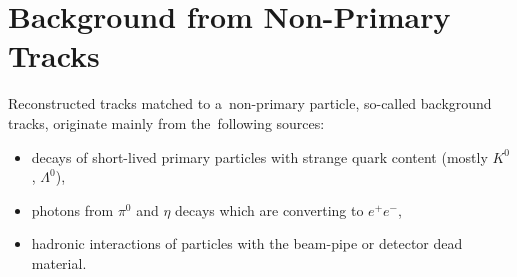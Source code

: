 \section{Background from Non-Primary Tracks}\label{section:star_background_primary}
Reconstructed tracks matched to a~non-primary particle, so-called background tracks,  originate  mainly from the~following sources:
\begin{itemize}
	\item decays of short-lived primary particles with strange quark content (mostly $K^0$, $\Lambda^0$),
	\item photons from $\pi^0$ and $\eta$ decays which are converting to $e^+e^-$,
	\item hadronic interactions of particles with the beam-pipe or detector dead material.
\end{itemize} 

